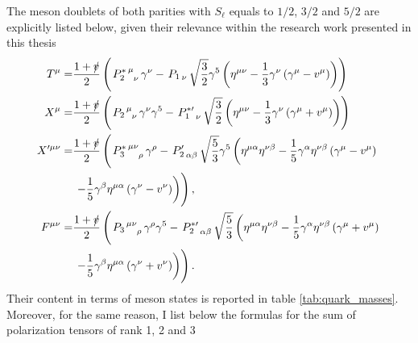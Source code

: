 The meson doublets of both parities with $S_\ell$ equals to $1/2$, $3/2$ and $5/2$ are explicitly listed below, given their relevance within the research work presented in this thesis
\begin{subequations}
  \begin{align}
    T^\mu =& \frac{1+\slashed{v}}{2} \left( \left. P^*_2 \right.\indices{^\mu_\nu} \gamma^\nu - \left. P_1 \right._\nu \sqrt{\frac{3}{2}} \gamma^5 \left( \eta^{\mu \nu} - \frac{1}{3} \gamma^\nu \left( \gamma^\mu - v^\mu \right) \right) \right) \\
    X^\mu =& \frac{1+\slashed{v}}{2} \left( \left. P_2 \right.\indices{^\mu_\nu} \gamma^\nu \gamma^5 - \left. P^{* \prime}_1 \right._\nu \sqrt{\frac{3}{2}} \left( \eta^{\mu \nu} - \frac{1}{3} \gamma^\nu \left( \gamma^\mu + v^\mu \right) \right) \right) \\
    X^{\prime \mu \nu} =& \frac{1 + \slashed{v}}{2} \left( \left. P^*_3 \right.\indices{^{\mu \nu}_\rho} \gamma^\rho - \left. P^\prime_2 \right. \indices{_{\alpha \beta}} \sqrt{\frac{5}{3}} \gamma^5 \left( \eta^{\mu \alpha} \eta^{\nu \beta} - \frac{1}{5} \gamma^\alpha \eta^{\nu \beta} \left( \gamma^\mu - v^\mu \right) \right. \right. \nonumber \\
  \phantom{X^{\prime \mu \nu} =}& \left. \left. - \frac{1}{5} \gamma^\beta \eta^{\mu \alpha} \left( \gamma^\nu - v^\nu \right) \right) \vphantom{\sqrt{\frac{5}{3}}} \! \right) , \\
  F^{\mu \nu} =& \frac{1 + \slashed{v}}{2} \left( \left. P_3 \right.\indices{^{\mu \nu}_\rho} \gamma^\rho \gamma^5 - \left. P^{* \prime}_2 \right.\indices{_{\alpha \beta}} \sqrt{\frac{5}{3}} \left( \eta^{\mu \alpha} \eta^{\nu \beta} - \frac{1}{5} \gamma^\alpha \eta^{\nu \beta} \left( \gamma^\mu + v^\mu \right) \right. \right. \nonumber \\  
  \phantom{F^{\mu \nu} =}& \left. \left. - \frac{1}{5} \gamma^\beta \eta^{\mu \alpha} \left( \gamma^\nu + v^\nu \right) \right) \vphantom{\sqrt{\frac{5}{3}}} \! \right) . 
  \end{align}
  \label{eq:other_doublets}
\end{subequations}
Their content in terms of meson states is reported in table \ref{tab:quark_masses}. Moreover, for the same reason, I list below the formulas for the sum of polarization tensors of rank 1, 2 and 3
